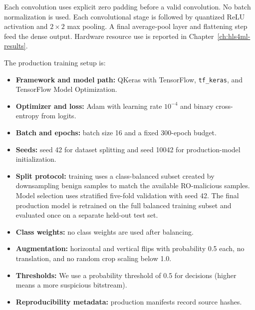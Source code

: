 Each convolution uses explicit zero padding before a valid convolution. No batch normalization is used. Each convolutional stage is followed by quantized ReLU activation and $2 \times 2$ max pooling. A final average-pool layer and flattening step feed the dense output. Hardware resource use is reported in Chapter~\ref{ch:hls4ml-results}.

The production training setup is:
\begin{itemize}
    \item \textbf{Framework and model path:} QKeras with TensorFlow, \texttt{tf\_keras}, and TensorFlow Model Optimization.
    \item \textbf{Optimizer and loss:} Adam with learning rate $10^{-4}$ and binary cross-entropy from logits.
    \item \textbf{Batch and epochs:} batch size 16 and a fixed 300-epoch budget.
    \item \textbf{Seeds:} seed 42 for dataset splitting and seed 10042 for production-model initialization.
    \item \textbf{Split protocol:} training uses a class-balanced subset created by downsampling benign samples to match the available RO-malicious samples. Model selection uses stratified five-fold validation with seed 42. The final production model is retrained on the full balanced training subset and evaluated once on a separate held-out test set.
    \item \textbf{Class weights:} no class weights are used after balancing.
    \item \textbf{Augmentation:} horizontal and vertical flips with probability 0.5 each, no translation, and no random crop scaling below 1.0.
    \item \textbf{Thresholds:} We use a probability threshold of 0.5 for decisions (higher means a more suspicious bitstream).
    \item \textbf{Reproducibility metadata:} production manifests record source hashes.
\end{itemize}

